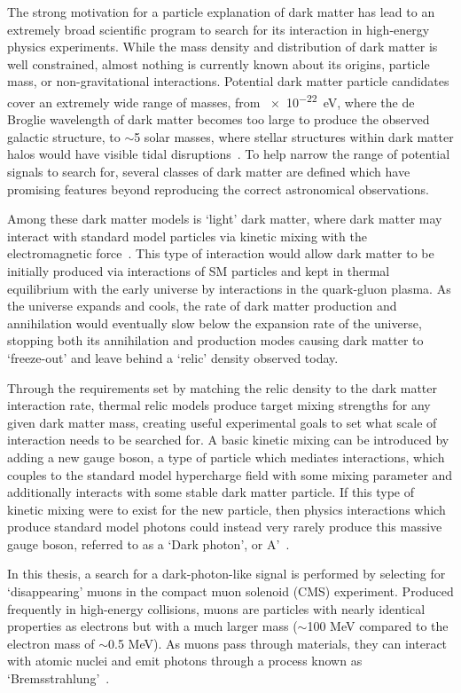 The strong motivation for a particle explanation of dark matter has lead to an extremely broad scientific program to search for its interaction in high-energy physics experiments. 
While the mass density and distribution of dark matter is well constrained, almost nothing is currently known about its origins, particle mass, or non-gravitational interactions.
Potential dark matter particle candidates cover an extremely wide range of masses, from \SI{e-22}{\eV}, where the de Broglie wavelength of dark matter becomes too large to produce the observed galactic structure, to $\sim$5 solar masses, where stellar structures within dark matter halos would have visible tidal disruptions~\cite{rodriguez_2014}.
To help narrow the range of potential signals to search for, several classes of dark matter are defined which have promising features beyond reproducing the correct astronomical observations. 

Among these dark matter models is `light' dark matter, where dark matter may interact with standard model particles via kinetic mixing with the electromagnetic force~\cite{darkSectors}. 
This type of interaction would allow dark matter to be initially produced via interactions of SM particles and kept in thermal equilibrium with the early universe by interactions in the quark-gluon plasma.
As the universe expands and cools, the rate of dark matter production and annihilation would eventually slow below the expansion rate of the universe, stopping both its annihilation and production modes causing dark matter to `freeze-out' and leave behind a `relic' density observed today.

Through the requirements set by matching the relic density to the dark matter interaction rate, thermal relic models produce target mixing strengths for any given dark matter mass, creating useful experimental goals to set what scale of interaction needs to be searched for.
A basic kinetic mixing can be introduced by adding a new gauge boson, a type of particle which mediates interactions, which couples to the standard model hypercharge field with some mixing parameter and additionally interacts with some stable dark matter particle.
If this type of kinetic mixing were to exist for the new particle, then physics interactions which produce standard model photons could instead very rarely produce this massive gauge boson, referred to as a `Dark photon', or A'~\cite{Bauer_2018}. 

In this thesis, a search for a dark-photon-like signal is performed by selecting for `disappearing' muons in the compact muon solenoid (CMS) experiment. 
Produced frequently in high-energy collisions, muons are particles with nearly identical properties as electrons but with a much larger mass ($\sim$100 MeV compared to the electron mass of $\sim$0.5 MeV).
As muons pass through materials, they can interact with atomic nuclei and emit photons through a process known as `Bremsstrahlung'~\cite{tsai_1974}.

